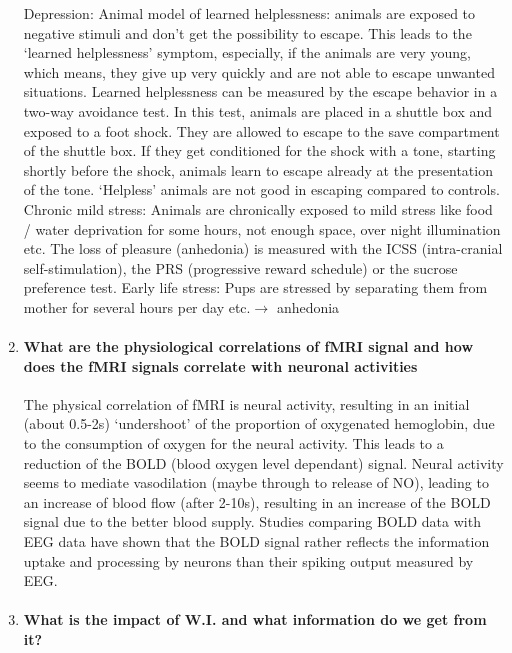 \documentclass[12pt,article,oneside,a4paper]{memoir}
\begin{document}
\begin{enumerate}
	Depression:
	Animal model of learned helplessness: animals are exposed to negative stimuli and don’t get the possibility to escape. This leads to the ‘learned helplessness’ symptom, especially, if the animals are very young, which means, they give up very quickly and are not able to escape unwanted situations. Learned helplessness can be measured by the escape behavior in a two-way avoidance test. In this test, animals are placed in a shuttle box and exposed to a foot shock. They are allowed to escape to the save compartment of the shuttle box. If they get conditioned for the shock with a tone, starting shortly before the shock, animals learn to escape already at the presentation of the tone. ‘Helpless’ animals are not good in escaping compared to controls.
	Chronic mild stress: Animals are chronically exposed to mild stress like food / water deprivation for some hours, not enough space, over night illumination etc. The loss of pleasure (anhedonia) is measured with the ICSS (intra-cranial self-stimulation), the PRS (progressive reward schedule) or the sucrose preference test.
	Early life stress: Pups are stressed by separating them from mother for several hours per day etc.$\rightarrow$ anhedonia
	
\item \paragraph{What are the physiological correlations of fMRI signal and how does the fMRI signals correlate with neuronal activities
}

The physical correlation of fMRI is neural activity, resulting in an initial (about 0.5-2s) ‘undershoot’ of the proportion of oxygenated hemoglobin, due to the consumption of oxygen for the neural activity. This leads to a reduction of the BOLD (blood oxygen level dependant) signal. Neural activity seems to mediate vasodilation (maybe through to release of NO), leading to an increase of blood flow (after 2-10s), resulting in an increase of the BOLD signal due to the better blood supply. Studies comparing BOLD data with EEG data have shown that the BOLD signal rather reflects the information uptake and processing by neurons than their spiking output measured by EEG.

\item \paragraph{What is the impact of W.I. and what information do we get from it?}


\end{enumerate}
\end{document}
